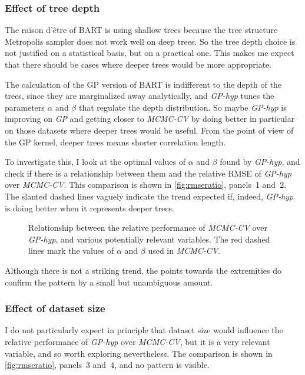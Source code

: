 \documentclass[a4paper]{article}
\theoremstyle{definition}
\newcommand{\widecenter}[1]{\noindent\hspace{-\textwidth}\makebox[3\textwidth][c]{#1}}
\newcommand{\includempl}[1]{\texttt{[image: \#1]}}
\begin{document}
    \subsubsection{Effect of tree depth}
    \label{sec:treedepth}

    The raison d'être of BART is using shallow trees because the tree structure Metropolis sampler does not work well on deep trees. So the tree depth choice is not justified on a statistical basis, but on a practical one. This makes me expect that there should be cases where deeper trees would be more appropriate.

    The calculation of the GP version of BART is indifferent to the depth of the trees, since they are marginalized away analytically, and \emph{GP-hyp} tunes the parameters $\alpha$ and $\beta$ that regulate the depth distribution. So maybe \emph{GP-hyp} is improving on \emph{GP} and getting closer to \emph{MCMC-CV} by doing better in particular on those datasets where deeper trees would be useful. From the point of view of the GP kernel, deeper trees means shorter correlation length.

    To investigate this, I look at the optimal values of $\alpha$ and $\beta$ found by \emph{GP-hyp}, and check if there is a relationship between them and the relative RMSE of \emph{GP-hyp} over \emph{MCMC-CV}. This comparison is shown in \autoref{fig:rmseratio}, panels~1 and~2. The slanted dashed lines vaguely indicate the trend expected if, indeed, \emph{GP-hyp} is doing better when it represents deeper trees.

    \begin{figure}
        \widecenter{\includempl{articleplot4}}
        \caption{\label{fig:rmseratio} Relationship between the relative performance of \emph{MCMC-CV} over \emph{GP-hyp}, and various potentially relevant variables. The red dashed lines mark the values of $\alpha$ and $\beta$ used in \emph{MCMC-CV}.}
    \end{figure}

    Although there is not a striking trend, the points towards the extremities do confirm the pattern by a small but unambiguous amount.

    \subsubsection{Effect of dataset size}
    \label{sec:datasize}

    I do not particularly expect in principle that dataset size would influence the relative performance of \emph{GP-hyp} over \emph{MCMC-CV}, but it is a very relevant variable, and so worth exploring nevertheless. The comparison is shown in \autoref{fig:rmseratio}, panels~3 and~4, and no pattern is visible.
    
\end{document}
